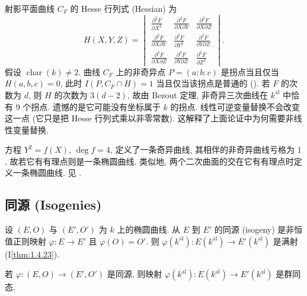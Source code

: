 \begin{aside} \label{thm:2.1.3} 
射影平面曲线 $C_F$ 的 Hesse 行列式 (Hessian) 为
\[
H(X,Y,Z) = \begin{vmatrix}
\frac{\partial^2F}{\partial X^2} & \frac{\partial^2F}{\partial X\partial Y} & \frac{\partial^2F}{\partial X\partial Z}\\
\frac{\partial^2F}{\partial X\partial Y} & \frac{\partial^2F}{\partial Y^2} & \frac{\partial^2F}{\partial Y\partial Z}\\
\frac{\partial^2F}{\partial X\partial Z} & \frac{\partial^2F}{\partial Y\partial Z} & \frac{\partial^2F}{\partial Z^2}
\end{vmatrix}.
\]
假设 $\operatorname{char}(k)\neq 2$. 曲线 $C_F$ 上的非奇异点 $P = (a:b:c)$ 是拐点当且仅当 $H(a,b,c) = 0$, 此时 $I(P, C_F\cap H) = 1$ 当且仅当该拐点是普通的 (\cite[\S5.3, Theorem]{fulton1969}). 若 $F$ 的次数为 $d$, 则 $H$ 的次数为 $3(d-2)$, 故由 Bezout 定理, 非奇异三次曲线在 $k^{\mathrm{al}}$ 中恰有 $9$ 个拐点. 遗憾的是它可能没有坐标属于 $k$ 的拐点. 线性可逆变量替换不会改变这一点 (它只是把 Hesse 行列式乘以非零常数). 这解释了上面论证中为何需要非线性变量替换.
\end{aside}

\begin{aside} \label{thm:2.1.4} 
方程 $Y^2 = f(X)$, $\deg f = 4$, 定义了一条奇异曲线, 其相伴的非奇异曲线亏格为 $1$, 故若它有有理点则是一条椭圆曲线. 类似地, 两个二次曲面的交在它有有理点时定义一条椭圆曲线. 见 \cite[p.~35]{cassels1991}.
\end{aside}

\subsection*{同源 (Isogenies)}
设 $(E,O)$ 与 $(E',O')$ 为 $k$ 上的椭圆曲线. 从 $E$ 到 $E'$ 的同源 (isogeny) 是非恒值正则映射 $\varphi\colon E\to E'$ 且 $\varphi(O) = O'$. 则 $\varphi(k^{\mathrm{al}})\colon E(k^{\mathrm{al}})\to E'(k^{\mathrm{al}})$ 是满射 (I\ref{thm:1.4.23}).

\begin{proposition} \label{thm:2.1.5} 
若 $\varphi\colon (E,O)\to(E',O')$ 是同源, 则映射 $\varphi(k^{\mathrm{al}})\colon E(k^{\mathrm{al}})\to E'(k^{\mathrm{al}})$ 是群同态.
\end{proposition}

